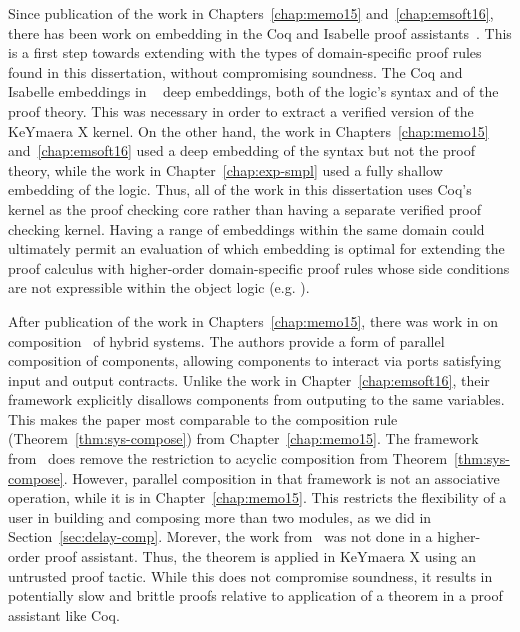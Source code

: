 Since publication of the work in Chapters~\ref{chap:memo15}
and~\ref{chap:emsoft16}, there has been work on embedding \dL{} in the Coq
and Isabelle proof assistants~\cite{Bohrer17-verified-dl}. This is a first
step towards extending \dL{} with the types of domain-specific proof rules
found in this dissertation, without compromising soundness. The Coq and
Isabelle embeddings in ~\cite{Bohrer17-verified-dl} deep embeddings, both
of the logic's syntax and of the proof theory. This was necessary in order
to extract a verified version of the KeYmaera X kernel. On the other hand,
the work in Chapters~\ref{chap:memo15} and~\ref{chap:emsoft16} used a deep
embedding of the syntax but not the proof theory, while the work in
Chapter~\ref{chap:exp-smpl} used a fully shallow embedding of the
logic. Thus, all of the work in this dissertation uses Coq's kernel as the
proof checking core rather than having a separate verified proof checking
kernel. Having a range of embeddings within the same domain could
ultimately permit an evaluation of which embedding is optimal for extending
the proof calculus with higher-order domain-specific proof rules whose side
conditions are not expressible within the object logic (e.g. \dL{}).

After publication of the work in Chapters~\ref{chap:memo15}, there was work
in \dL{} on composition~\cite{Muller16comp,Muller17comp} of hybrid
systems. The authors provide a form of parallel composition of components,
allowing components to interact via ports satisfying input and output
contracts. Unlike the work in Chapter~\ref{chap:emsoft16}, their framework
explicitly disallows components from outputing to the same variables. This
makes the paper most comparable to the composition rule
(Theorem~\ref{thm:sys-compose}) from Chapter~\ref{chap:memo15}. The
framework from~\cite{Muller16comp,Muller17comp} does remove the restriction
to acyclic composition from Theorem~\ref{thm:sys-compose}. However,
parallel composition in that framework is not an associative operation,
while it is in Chapter~\ref{chap:memo15}. This restricts the flexibility of
a user in building and composing more than two modules, as we did in
Section~\ref{sec:delay-comp}. Morever, the work
from~\cite{Muller16comp,Muller17comp} was not done in a higher-order proof
assistant. Thus, the theorem is applied in KeYmaera X using an untrusted
proof tactic. While this does not compromise soundness, it results in
potentially slow and brittle proofs relative to application of a theorem in
a proof assistant like Coq.

